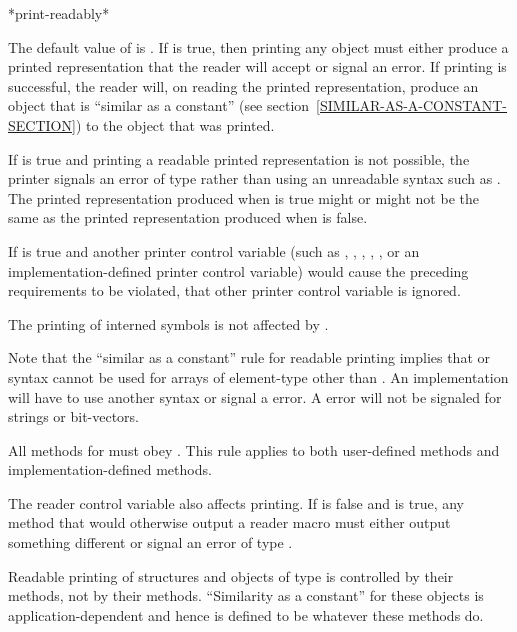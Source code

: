 \begin{newer}
\begin{defun}[Variable]
*print-readably*

The default value of  is
  .  If  is true, then printing any object must either
  produce a
  printed representation that the reader will accept or signal an error.
  If printing is successful, the reader will, on reading the printed representation,
  produce an object that is ``similar as a constant''
  (see section~\ref{SIMILAR-AS-A-CONSTANT-SECTION}) to the object that was printed.

  If  is true and printing a readable printed
  representation is not possible, the printer signals an error of type
   rather than using an unreadable syntax such as \cd{\#<}.
  The printed representation produced when  is true might
  or might not be the same as the printed representation produced when
   is false.

  If  is true and another printer control variable
  (such as , , , ,
  , or an implementation-defined printer control variable)
  would cause the preceding requirements to be violated, that other
  printer control variable is ignored.

  The printing of interned symbols is not affected by .

  Note that the ``similar as a constant'' rule for readable printing
  implies that  or \cd{\#(} syntax cannot be used for arrays of element-type
  other than .  An implementation will have to use another syntax or
  signal a  error.  A  error will not
  be signaled for strings or bit-vectors.

  All methods for  must obey .  This
  rule applies to both user-defined methods and implementation-defined methods.

  The reader control variable  also affects printing.
  If  is false and  is true, any 
  method that would otherwise output a  reader macro must either output something
  different or signal an error of type .

  Readable printing of structures and objects of type 
  is controlled
  by their  methods, not by their  methods.
  ``Similarity as a constant'' for these objects is application-dependent
  and hence is defined to be whatever these methods do.


\end{defun}
\end{newer}
